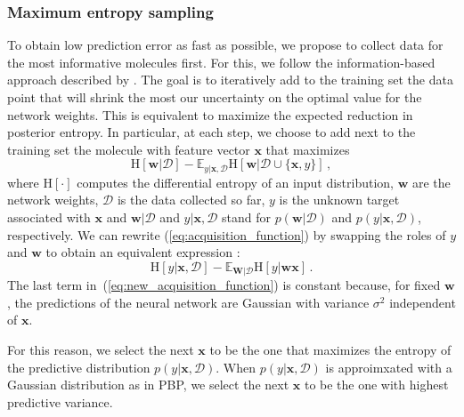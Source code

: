 \subsubsection{Maximum entropy sampling}

To obtain low prediction error as fast as possible, we propose to collect data for the most informative molecules first. For this, we follow the information-based approach described by \cite{MacKay_1992}. The goal is to iteratively add to the training set the data point that will shrink the most our uncertainty on the optimal value for the network weights. This is equivalent to maximize the expected reduction in posterior entropy. In particular, at each step, we choose to add next to the training set the molecule with feature vector $\mathbf{x}$ that maximizes
\begin{equation}
\text{H}[\mathbf{w}|\mathcal{D}]  - 
\mathbb{E}_{y|\mathbf{x},\mathcal{D}}\text{H}[\mathbf{w}|\mathcal{D}\cup\{\mathbf{x},y\}]\,,\label{eq:acquisition_function}
\end{equation}
where $\text{H}[\cdot]$ computes the differential entropy of an input distribution, $\mathbf{w}$ are the network weights, $\mathcal{D}$ is the data collected so far, $y$ is the unknown target associated with $\mathbf{x}$ and $\mathbf{w}|\mathcal{D}$ and $y|\mathbf{x},\mathcal{D}$ stand for $p(\mathbf{w}|\mathcal{D})$ and $p(y|\mathbf{x},\mathcal{D})$, respectively. We can rewrite (\ref{eq:acquisition_function}) by swapping the roles of $y$ and $\mathbf{w}$ to obtain an equivalent expression \cite{houlsby2012collaborative}:
\begin{equation}
\text{H}[y | \mathbf{x},\mathcal{D}] - 
\mathbb{E}_{\mathbf{W} | \mathcal{D}}\text{H}[y | \mathbf{w}\mathbf{x}]\,.\label{eq:new_acquisition_function}
\end{equation}
The last term in~(\ref{eq:new_acquisition_function}) is constant because, for fixed $\mathbf{w}$, the predictions of the neural network are Gaussian with variance $\sigma^2$ independent of $\mathbf{x}$. 

For this reason, we select the next $\mathbf{x}$ to be the one that maximizes the entropy of the predictive distribution $p(y| \mathbf{x},\mathcal{D})$. When $p(y| \mathbf{x},\mathcal{D})$ is approimxated with a Gaussian distribution as in PBP, we select the next $\mathbf{x}$ to be the one with highest predictive variance.